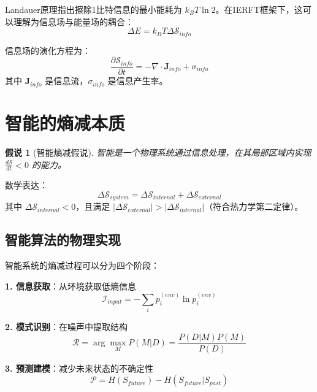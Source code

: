 \documentclass[12pt,a4paper]{article}
\newtheorem{hypothesis}{假说}
\begin{document}
Landauer原理指出擦除1比特信息的最小能耗为 $k_B T \ln 2$。在IERFT框架下，这可以理解为信息场与能量场的耦合：
\begin{equation}
\Delta E = k_B T \Delta \mathcal{S}_{info}
\end{equation}

信息场的演化方程为：
\begin{equation}
\frac{\partial \mathcal{S}_{info}}{\partial t} = -\nabla \cdot \mathbf{J}_{info} + \sigma_{info}
\end{equation}
其中 $\mathbf{J}_{info}$ 是信息流，$\sigma_{info}$ 是信息产生率。

\section{智能的熵减本质}

\begin{hypothesis}[智能熵减假说]
智能是一个物理系统通过信息处理，在其局部区域内实现 $\frac{d\mathcal{S}}{dt} < 0$ 的能力。
\end{hypothesis}

数学表达：
\begin{equation}
\Delta \mathcal{S}_{system} = \Delta \mathcal{S}_{internal} + \Delta \mathcal{S}_{external}
\end{equation}
其中 $\Delta \mathcal{S}_{internal} < 0$，且满足 $| \Delta \mathcal{S}_{external} | > | \Delta \mathcal{S}_{internal} |$（符合热力学第二定律）。

\subsection{智能算法的物理实现}

智能系统的熵减过程可以分为四个阶段：

\textbf{1. 信息获取}：从环境获取低熵信息
\begin{equation}
\mathcal{I}_{input} = -\sum_i p_i^{(env)} \ln p_i^{(env)}
\end{equation}

\textbf{2. 模式识别}：在噪声中提取结构
\begin{equation}
\mathcal{R} = \arg\max_{M} P(M|D) = \frac{P(D|M)P(M)}{P(D)}
\end{equation}

\textbf{3. 预测建模}：减少未来状态的不确定性
\begin{equation}
\mathcal{P} = H(S_{future}) - H(S_{future}|S_{past})
\end{equation}
\end{document}
